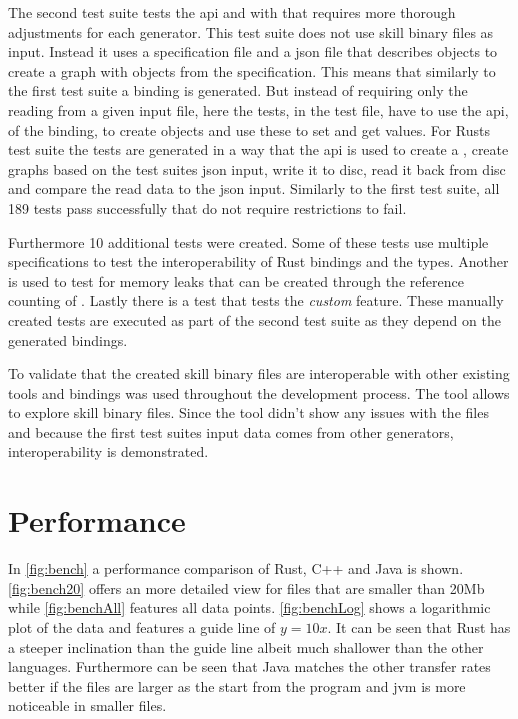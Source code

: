 \documentclass[thesis]{subfiles}
\begin{document}
  The second test suite tests the \gls{api} and with that requires more thorough adjustments for each generator.
  This test suite does not use \gls{skill} binary files as input.
  Instead it uses a specification file and a \gls{json} file that describes objects to create a graph with objects from the specification.
  This means that similarly to the first test suite a binding is generated.
  But instead of requiring only the reading from a given input file, here the tests, in the test file, have to use the \gls{api}, of the binding, to create objects and use these to set and get values.
  For Rusts test suite the tests are generated in a way that the \gls{api} is used to create a \SkillFile, create graphs based on the test suites \gls{json} input, write it to disc, read it back from disc and compare the read data to the \gls{json} input.
  Similarly to the first test suite, all 189 tests pass successfully that do not require restrictions to fail.%

  Furthermore 10 additional tests were created.
  Some of these tests use multiple specifications to test the interoperability of Rust bindings and the \Foreign types.
  Another is used to test for memory leaks that can be created through the reference counting of \PtrT.
  Lastly there is a test that tests the \emph{custom} feature.
  These manually created tests are executed as part of the second test suite as they depend on the generated bindings.

  To validate that the created \gls{skill} binary files are interoperable with other existing tools and bindings \autocite{skill-view} was used throughout the development process.
  The tool allows to explore \gls{skill} binary files.
  Since the tool didn't show any issues with the files and because the first test suites input data comes from other generators, interoperability is demonstrated.

\section{Performance}
  In \autoref{fig:bench} a performance comparison of Rust, C++ and Java is shown.
  \autoref{fig:bench20} offers an more detailed view for files that are smaller than 20Mb while \autoref{fig:benchAll} features all data points.
  \autoref{fig:benchLog} shows a logarithmic plot of the data and features a guide line of $y=10x$.
  It can be seen that Rust has a steeper inclination than the guide line albeit much shallower than the other languages.
  Furthermore can be seen that Java matches the other transfer rates better if the files are larger as the start from the program and \gls{jvm} is more noticeable in smaller files.
\end{document}
